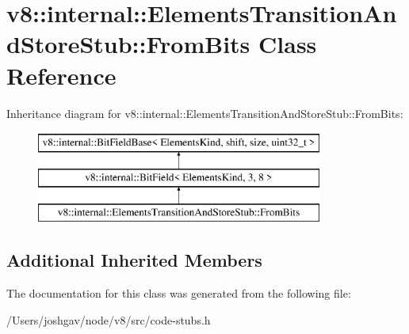 \hypertarget{classv8_1_1internal_1_1_elements_transition_and_store_stub_1_1_from_bits}{}\section{v8\+:\+:internal\+:\+:Elements\+Transition\+And\+Store\+Stub\+:\+:From\+Bits Class Reference}
\label{classv8_1_1internal_1_1_elements_transition_and_store_stub_1_1_from_bits}
Inheritance diagram for v8\+:\+:internal\+:\+:Elements\+Transition\+And\+Store\+Stub\+:\+:From\+Bits\+:\begin{figure}[H]
\begin{center}
\leavevmode
\includegraphics[height=3.000000cm]{classv8_1_1internal_1_1_elements_transition_and_store_stub_1_1_from_bits}
\end{center}
\end{figure}
\subsection*{Additional Inherited Members}


The documentation for this class was generated from the following file\+:\begin{DoxyCompactItemize}
\item 
/\+Users/joshgav/node/v8/src/code-\/stubs.\+h\end{DoxyCompactItemize}
